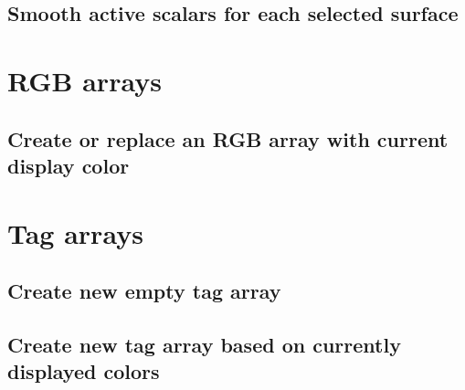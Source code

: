 \subsection{Smooth active scalars for each selected surface}


\section{RGB arrays}
\subsection{Create or replace an RGB array with current display color}
\section{Tag arrays}
\subsection{Create new empty tag array}
\subsection{Create new tag array based on currently displayed colors}



